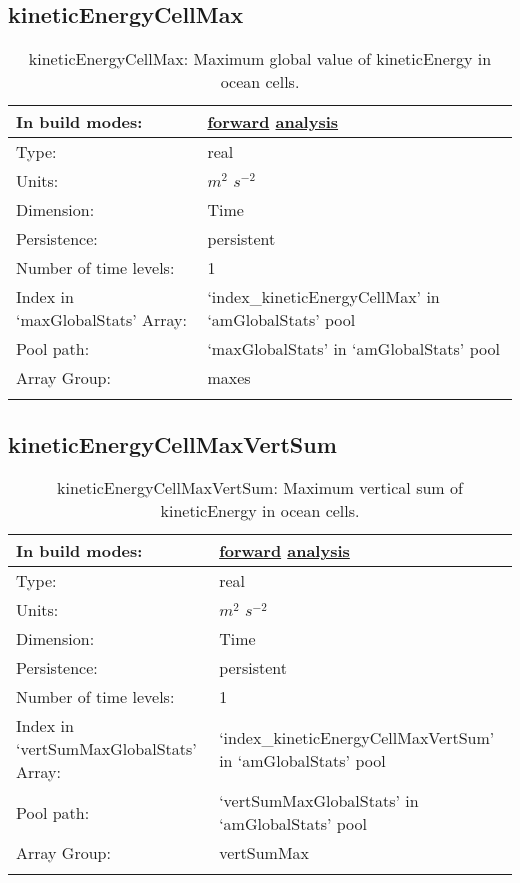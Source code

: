 \subsection[kineticEnergyCellMax]{kineticEnergyCellMax}
\label{subsec:var_sec_amGlobalStats_kineticEnergyCellMax}
\begin{center}
\begin{longtable}{| p{2.0in} | p{4.0in} |}
        \hline 
        In build modes: & \hyperref[subsec:forward_var_tab_amGlobalStats]{forward} \hyperref[subsec:analysis_var_tab_amGlobalStats]{analysis} \\
        \hline 
        Type: & real \\
        \hline 
        Units: & $m^2$ $s^{-2}$ \\
        \hline 
        Dimension: & Time \\
        \hline 
        Persistence: & persistent \\
        \hline 
        Number of time levels: & 1 \\
        \hline 
		 Index in `maxGlobalStats' Array: & `index\_kineticEnergyCellMax' in `amGlobalStats' pool \\
		 \hline 
            Pool path: & `maxGlobalStats' in `amGlobalStats' pool \\
		 \hline 
		 Array Group: & maxes \\
		 \hline 
    \caption{kineticEnergyCellMax: Maximum global value of kineticEnergy in ocean cells.}
\end{longtable}
\end{center}
\subsection[kineticEnergyCellMaxVertSum]{kineticEnergyCellMaxVertSum}
\label{subsec:var_sec_amGlobalStats_kineticEnergyCellMaxVertSum}
\begin{center}
\begin{longtable}{| p{2.0in} | p{4.0in} |}
        \hline 
        In build modes: & \hyperref[subsec:forward_var_tab_amGlobalStats]{forward} \hyperref[subsec:analysis_var_tab_amGlobalStats]{analysis} \\
        \hline 
        Type: & real \\
        \hline 
        Units: & $m^2$ $s^{-2}$ \\
        \hline 
        Dimension: & Time \\
        \hline 
        Persistence: & persistent \\
        \hline 
        Number of time levels: & 1 \\
        \hline 
		 Index in `vertSumMaxGlobalStats' Array: & `index\_kineticEnergyCellMaxVertSum' in `amGlobalStats' pool \\
		 \hline 
            Pool path: & `vertSumMaxGlobalStats' in `amGlobalStats' pool \\
		 \hline 
		 Array Group: & vertSumMax \\
		 \hline 
    \caption{kineticEnergyCellMaxVertSum: Maximum vertical sum of kineticEnergy in ocean cells.}
\end{longtable}
\end{center}
